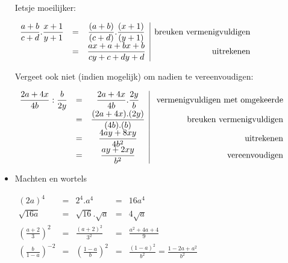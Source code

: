 \begin{itemize}
	\noindent Ietsje moeilijker:
	
	\begin{math}
		\centering
	\begin{array}{ccc|r}
	{\displaystyle \frac{a+b}{c+d}.\frac{x+1}{y+1}} & = & {\displaystyle \frac{(a+b)}{(c+d)}.\frac{(x+1)}{(y+1)}} & \text{breuken vermenigvuldigen}\\
	& = & {\displaystyle \frac{ax+a+bx+b}{cy+c+dy+d}} & \text{uitrekenen}\\
	\end{array}
	\end{math}
	
	
	
	\noindent Vergeet ook niet (indien mogelijk) om nadien te vereenvoudigen:
	
	\begin{math}
	\centering
	\begin{array}{ccc|r}
	{\displaystyle \frac{2a+4x}{4b}:\frac{b}{2y}} & = & {\displaystyle \frac{2a+4x}{4b}.\frac{2y}{b}} & \text{ vermenigvuldigen met omgekeerde}\\
	& = & {\displaystyle \frac{(2a+4x).(2y)}{(4b).(b)}} & \text{breuken vermenigvuldigen}\\
	& = & {\displaystyle \frac{4ay+8xy}{4b^{2}}} &  \text{uitrekenen}\\
	& = & {\displaystyle \frac{ay+2xy}{b^{2}}} & \text{vereenvoudigen}\\
	\end{array}
	\end{math}
	
	\item{Machten en wortels}
	
	\begin{math}
	\begin{array}{ccccc}
	(2a)^{4} & = & 2^{4}.a^{4} &=& 16a^{4} \\
	\sqrt{16a} & = & \sqrt{16}.\sqrt{a}&=&4\sqrt{a} \\
	\left(\frac{a+2}{3}\right)^{2} & = &  \frac{(a+2)^{2}}{3^{2}}&=&\frac{a^{2}+4a+4}{9} \\
	\left(\frac{b}{1-a}\right)^{-2} & = &  \left(\frac{1-a}{b}\right)^{2}&=&\frac{(1-a)^{2}}{b^{2}}=\frac{1-2a+a^{2}}{b^{2}} \\
	\end{array}
	\end{math}
	
\end{itemize}


